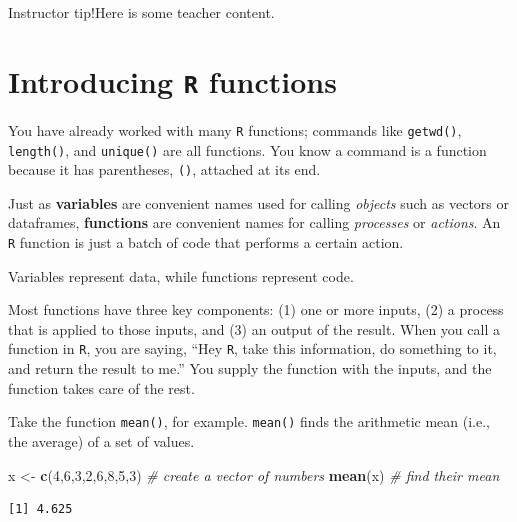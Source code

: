 \documentclass[
]{book}
\newenvironment{Shaded}{\begin{snugshade}}{\end{snugshade}}
\newcommand{\CommentTok}[1]{\textcolor[rgb]{0.56,0.35,0.01}{\textit{#1}}}
\newcommand{\DecValTok}[1]{\textcolor[rgb]{0.00,0.00,0.81}{#1}}
\newcommand{\KeywordTok}[1]{\textcolor[rgb]{0.13,0.29,0.53}{\textbf{#1}}}
\newcommand{\NormalTok}[1]{#1}
\newcommand{\StringTok}[1]{\textcolor[rgb]{0.31,0.60,0.02}{#1}}
\begin{document}
Instructor tip!Here is some teacher content.

\hypertarget{introducing-r-functions}{%
\section*{\texorpdfstring{Introducing \texttt{R} functions}{Introducing R functions}}\label{introducing-r-functions}}

You have already worked with many \texttt{R} functions; commands like \texttt{getwd()}, \texttt{length()}, and \texttt{unique()} are all functions. You know a command is a function because it has parentheses, \texttt{()}, attached at its end.

Just as \textbf{variables} are convenient names used for calling \emph{objects} such as vectors or dataframes, \textbf{functions} are convenient names for calling \emph{processes} or \emph{actions}. An \texttt{R} function is just a batch of code that performs a certain action.

Variables represent data, while functions represent code.

Most functions have three key components: (1) one or more inputs, (2) a process that is applied to those inputs, and (3) an output of the result. When you call a function in \texttt{R}, you are saying, ``Hey \texttt{R}, take this information, do something to it, and return the result to me.'' You supply the function with the inputs, and the function takes care of the rest.

Take the function \texttt{mean()}, for example. \texttt{mean()} finds the arithmetic mean (i.e., the average) of a set of values.

\begin{Shaded}
\begin{Highlighting}[]
\NormalTok{x <-}\StringTok{ }\KeywordTok{c}\NormalTok{(}\DecValTok{4}\NormalTok{,}\DecValTok{6}\NormalTok{,}\DecValTok{3}\NormalTok{,}\DecValTok{2}\NormalTok{,}\DecValTok{6}\NormalTok{,}\DecValTok{8}\NormalTok{,}\DecValTok{5}\NormalTok{,}\DecValTok{3}\NormalTok{) }\CommentTok{# create a vector of numbers}
\KeywordTok{mean}\NormalTok{(x) }\CommentTok{# find their mean}
\end{Highlighting}
\end{Shaded}

\begin{verbatim}
[1] 4.625
\end{verbatim}
\end{document}
